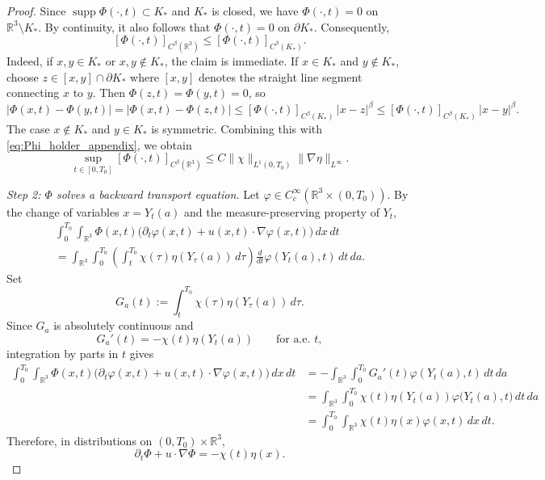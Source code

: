 \documentclass[reqno,11pt]{amsart}
\newcommand{\supp}{\operatorname{supp}}
\begin{document}
\begin{proof}
Since $\supp \Phi(\cdot,t)\subset K_*$ and $K_*$ is closed, we have
$\Phi(\cdot,t)=0$ on $\mathbb R^3\setminus K_*$. By continuity, it also follows that
$\Phi(\cdot,t)=0$ on $\partial K_*$. Consequently,
\[
[\Phi(\cdot,t)]_{C^\beta(\mathbb R^3)}
\le
[\Phi(\cdot,t)]_{C^\beta(K_*)}.
\]
Indeed, if $x,y\in K_*$ or $x,y\notin K_*$, the claim is immediate. If $x\in K_*$ and
$y\notin K_*$, choose $z\in [x,y]\cap\partial K_*$
 where $[x,y]$ denotes the straight line segment connecting $x$ to $y$.
Then $\Phi(z,t)=\Phi(y,t)=0$, so
\[
|\Phi(x,t)-\Phi(y,t)|
=
|\Phi(x,t)-\Phi(z,t)|
\le
[\Phi(\cdot,t)]_{C^\beta(K_*)}\,|x-z|^\beta
\le
[\Phi(\cdot,t)]_{C^\beta(K_*)}\,|x-y|^\beta.
\]
The case $x\notin K_*$ and $y\in K_*$ is symmetric. Combining this with
\eqref{eq:Phi_holder_appendix}, we obtain
\begin{equation}
\label{eq:Phi_holder_global_appendix}
\sup_{t\in[0,T_0]}[\Phi(\cdot,t)]_{C^\beta(\mathbb R^3)}
\le
C\|\chi\|_{L^1(0,T_0)}\|\nabla\eta\|_{L^\infty}.
\end{equation}


\smallskip
\noindent\emph{Step 2: $\Phi$ solves a backward transport equation.}
Let $\varphi\in C_c^\infty(\mathbb R^3\times(0,T_0))$. By the change of variables
$x=Y_t(a)$ and the measure-preserving property of $Y_t$,
\begin{multline*}
\int_0^{T_0}\int_{\mathbb R^3}
\Phi(x,t)\bigl(\partial_t\varphi(x,t)+u(x,t)\cdot\nabla\varphi(x,t)\bigr)\,dx\,dt 
\\
=
\int_{\mathbb R^3}\int_0^{T_0}
\left(\int_t^{T_0}\chi(\tau)\eta(Y_\tau(a))\,d\tau\right)
\frac{d}{dt}\varphi(Y_t(a),t)\,dt\,da .
\end{multline*}
Set
\[
G_a(t):=\int_t^{T_0}\chi(\tau)\eta(Y_\tau(a))\,d\tau.
\]
Since $G_a$ is absolutely continuous and
\[
G_a'(t)=-\chi(t)\eta(Y_t(a))
\qquad\text{for a.e. }t,
\]
integration by parts in $t$ gives
\begin{align*}
\int_0^{T_0}\int_{\mathbb R^3}
\Phi(x,t)\bigl(\partial_t\varphi(x,t)+u(x,t)\cdot\nabla\varphi(x,t)\bigr)\,dx\,dt 
&=
-\int_{\mathbb R^3}\int_0^{T_0}G_a'(t)\varphi(Y_t(a),t)\,dt\,da \\
&=
\int_{\mathbb R^3}\int_0^{T_0}\chi(t)\eta(Y_t(a))\varphi\big(Y_t(a),t\big)\,dt\,da \\
&=
\int_0^{T_0}\int_{\mathbb R^3}\chi(t)\eta(x)\varphi(x,t)\,dx\,dt .
\end{align*}
Therefore, in distributions on $(0,T_0)\times\mathbb R^3$,
\begin{equation}
\label{eq:Phi_backward_appendix}
\partial_t\Phi+u\cdot\nabla\Phi=-\chi(t)\eta(x).
\end{equation}


\end{proof}
\end{document}
